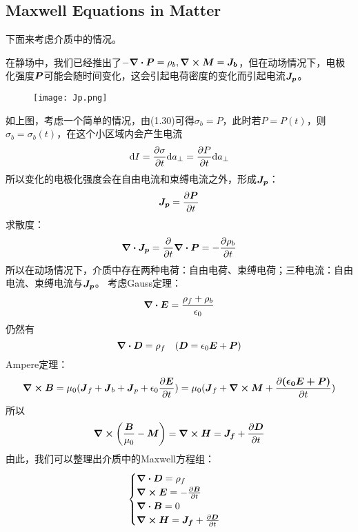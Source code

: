 \documentclass[14pt,oneside]{book}
\def \J{\vb*{J}}
\begin{document}
\begin{large}
\subsection{Maxwell Equations in Matter}
下面来考虑介质中的情况。

在静场中，我们已经推出了$-\div{\vb*{P}}=\rho_b,\curl{\vb*{M}}=\vb*{J_b}$，但在动场情况下，电极化强度$\vb*{P}$可能会随时间变化，这会引起电荷密度的变化而引起电流$\vb*{J_p}$。
\begin{figure}[H]
\centering
  \texttt{[image: Jp.png]}
\end{figure}
如上图，考虑一个简单的情况，由(1.30)可得$\sigma_b=P$，此时若$P=P(t)$，则$\sigma_b=\sigma_b(t)$，在这个小区域内会产生电流
\begin{equation}
  \dd I=\pdv{\sigma}{t}\dd a_\perp=\pdv{P}{t}\dd a_\perp
\end{equation}
所以变化的电极化强度会在自由电流和束缚电流之外，形成$\vb*{J_p}$：
\begin{equation}
  \vb*{J_p}=\pdv{\vb*{P}}{t}
\end{equation}
求散度：
\begin{equation}
  \div{\vb*{J_p}}=\pdv{}{t}\div{\vb*{P}}=-\pdv{\rho_b}{t}
\end{equation}
所以在动场情况下，介质中存在两种电荷：自由电荷、束缚电荷；三种电流：自由电流、束缚电流与$\vb*{J_p}$。
考虑Gauss定理：
\begin{equation}
  \div{\vb*{E}}=\frac{\rho_f+\rho_b}{\epsilon_0}
\end{equation}
仍然有
\begin{equation}
  \div{\vb*{D}}=\rho_f\quad(\vb*{D}=\epsilon_0 \vb*{E} + \vb*{P})
\end{equation}
Ampere定理：
\begin{equation}
  \curl{\vb*{B}}=\mu_0(\J_f+\J_b+\J_p+\epsilon_0\pdv{\vb*{E}}{t})=\mu_0(\J_f+\curl{\vb*{M}}+\pdv{\vb*{(\epsilon_0 \vb*{E}+P)}}{t})
\end{equation}
所以
\begin{equation}
  \curl{\left(\frac{\vb*{B}}{\mu_0}-\vb*{M}\right)}=\curl{\vb*{H}}=\vb*{J_f}+\pdv{\vb*{D}}{t}
\end{equation}
由此，我们可以整理出介质中的Maxwell方程组：
\begin{align}
	\begin{cases}
		\div{\vb*{D}}=\rho_f\\
		\curl{\vb*{E}}=-\pdv{\vb*{B}}{t}\\
		\div{\vb*{B}}=0\\
		\curl{\vb*{H}}= \vb*{J_f}+\pdv{\vb*{D}}{t}
	\end{cases}
\end{align}


\end{large}
\end{document}
